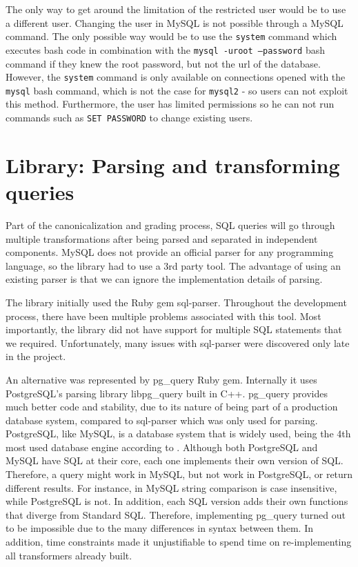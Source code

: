 The only way to get around the limitation of the restricted user would be to use a different user. Changing the user in MySQL is not possible through a MySQL command. The only possible way would be to use the \texttt{system} command which executes bash code in combination with the \texttt{mysql -uroot --password} bash command if they knew the root password, but not the url of the database. However, the \texttt{system} command is only available on connections opened with the \texttt{mysql} bash command, which is not the case for \texttt{mysql2} - so users can not exploit this method. Furthermore, the user has limited permissions so he can not run commands such as \texttt{SET PASSWORD} to change existing users.

\section{Library: Parsing and transforming queries}

Part of the canonicalization and grading process, SQL queries will go through multiple transformations after being parsed and separated in independent components. MySQL does not provide an official parser for any programming language, so the library had to use a 3rd party tool. The advantage of using an existing parser is that we can ignore the implementation details of parsing.

The library initially used the Ruby gem sql-parser. Throughout the development process, there have been multiple problems associated with this tool. Most importantly, the library did not have support for multiple SQL statements that we required. Unfortunately, many issues with sql-parser were discovered only late in the project.

An alternative was represented by pg\_query Ruby gem. Internally it uses PostgreSQL's parsing library libpg\_query built in C++. pg\_query provides much better code and stability, due to its nature of being part of a production database system, compared to sql-parser which was only used for parsing. PostgreSQL, like MySQL, is a database system that is widely used, being the 4th most used database engine according to \cite{db_engine:statistics}. Although both PostgreSQL and MySQL have SQL at their core, each one implements their own version of SQL. Therefore, a query might work in MySQL, but not work in PostgreSQL, or return different results. For instance, in MySQL string comparison is case insensitive, while PostgreSQL is not. In addition, each SQL version adds their own functions that diverge from Standard SQL. Therefore, implementing pg\_query turned out to be impossible due to the many differences in syntax between them. In addition, time constraints made it unjustifiable to spend time on re-implementing all transformers already built.


